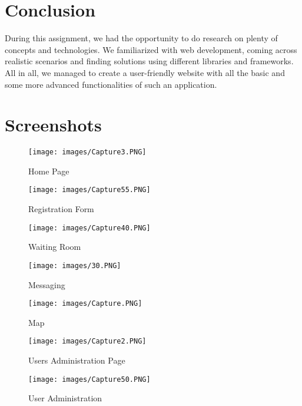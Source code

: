 \documentclass{article}
\begin{document}
\section{Conclusion}
During this assignment, we had the opportunity to do research on plenty of concepts and technologies. We familiarized with web development, coming across realistic scenarios and finding solutions using different libraries and frameworks. All in all, we managed to create a user-friendly website with all the basic and some more advanced functionalities of such an application.
\section{Screenshots}
\begin{figure}[htp]
    \centering
    \texttt{[image: images/Capture3.PNG]}
    \caption{Home Page}
    \label{fig:galaxy}
\end{figure}

\begin{figure}[htp]
    \centering
    \texttt{[image: images/Capture55.PNG]}
    \caption{Registration Form}
    \label{fig:galaxy}
\end{figure}

\begin{figure}[htp]
    \centering
    \texttt{[image: images/Capture40.PNG]}
    \caption{Waiting Room}
    \label{fig:galaxy}
\end{figure}

\begin{figure}[htp]
    \centering
    \texttt{[image: images/30.PNG]}
    \caption{Messaging}
    \label{fig:galaxy}
\end{figure}

\begin{figure}[htp]
    \centering
    \texttt{[image: images/Capture.PNG]}
    \caption{Map}
    \label{fig:galaxy}
\end{figure}

\begin{figure}[htp]
    \centering
    \texttt{[image: images/Capture2.PNG]}
    \caption{Users Administration Page}
    \label{fig:galaxy}
\end{figure}

\begin{figure}[htp]
    \centering
    \texttt{[image: images/Capture50.PNG]}
    \caption{User Administration}
    \label{fig:galaxy}
\end{figure}
\end{document}
